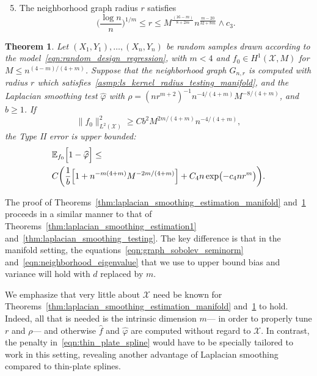 \documentclass[twoside]{article}
\newcommand{\1}{\mathbf{1}}
\newcommand{\Xset}{\mathcal{X}}
\newcommand{\Leb}{L}
\newcommand{\Ebb}{\mathbb{E}}
\newcommand{\wh}[1]{\widehat{#1}}
\newtheorem{theorem}{Theorem}
\theoremstyle{definition}
\theoremstyle{remark}
\begin{document}
\begin{enumerate}[label=(R\arabic*)]
	\setcounter{enumi}{4}
	\item 
	\label{asmp:ls_kernel_radius_testing_manifold}
	The neighborhood graph radius $r$ satisfies
	\begin{equation*}
	\biggl(\frac{\log n}{n}\biggr)^{1/m} \leq r \leq M^{\frac{(16 - m)}{8 + 2m}}n^{\frac{m - 20}{32 + 8m}} \wedge c_3.
	\end{equation*}
\end{enumerate}

\begin{theorem}
	\label{thm:laplacian_smoothing_testing_manifold}
	Let $(X_1,Y_1),\ldots,(X_n,Y_n)$ be random samples drawn according to the model~\eqref{eqn:random_design_regression}, with $m < 4$ and $f_0 \in H^1(\Xset,M)$ for $M \leq n^{(4 - m)/(4 + m)}$. Suppose that the neighborhood graph $G_{n,r}$ is computed with radius $r$ which satisfies~\ref{asmp:ls_kernel_radius_testing_manifold}, and the Laplacian smoothing test $\wh{\varphi}$ with $\rho = (nr^{m + 2})^{-1} n^{-4/(4 + m)} M^{-8/(4 + m)}$, and $b \geq 1$. If
	\begin{equation}
	\label{eqn:laplacian_smoothing_testing_manifold}
	\bigl\|f_0\bigr\|_{\Leb^2(\Xset)}^2 \geq C b^2 M^{2m/(4 + m)} n^{-4/(4 + m)},
	\end{equation} 
	the Type II error is upper bounded:
	\begin{align*}
	& \Ebb_{f_0}\Bigl[1 - \wh{\varphi} \Bigr] \leq \\
	& C\biggl(\frac{1}{b}\Bigl[1 + n^{-m(4 + m)}M^{-2m/(4 + m)}\Bigr] + C_4n\exp\bigl(-c_4nr^m\bigr)\biggr).
	\end{align*}
\end{theorem}
The proof of Theorems~\ref{thm:laplacian_smoothing_estimation_manifold} and~\ref{thm:laplacian_smoothing_testing_manifold} proceeds in a similar manner to that of Theorems~\ref{thm:laplacian_smoothing_estimation1} and~\ref{thm:laplacian_smoothing_testing}. The key difference is that in the manifold setting, the equations~\eqref{eqn:graph_sobolev_seminorm} and~\eqref{eqn:neighborhood_eigenvalue} that we use to upper bound bias and variance will hold with $d$ replaced by $m$.

We emphasize that very little about $\Xset$ need be known for Theorems~\ref{thm:laplacian_smoothing_estimation_manifold} and~\ref{thm:laplacian_smoothing_testing_manifold} to hold. Indeed, all that is needed is the intrinsic dimension $m$--- in order to properly tune $r$ and $\rho$--- and otherwise $\wh{f}$ and $\wh{\varphi}$ are computed without regard to $\Xset$. In contrast, the penalty in~\eqref{eqn:thin_plate_spline} would have to be specially tailored to work in this setting, revealing another advantage of Laplacian smoothing compared to thin-plate splines.
\end{document}

